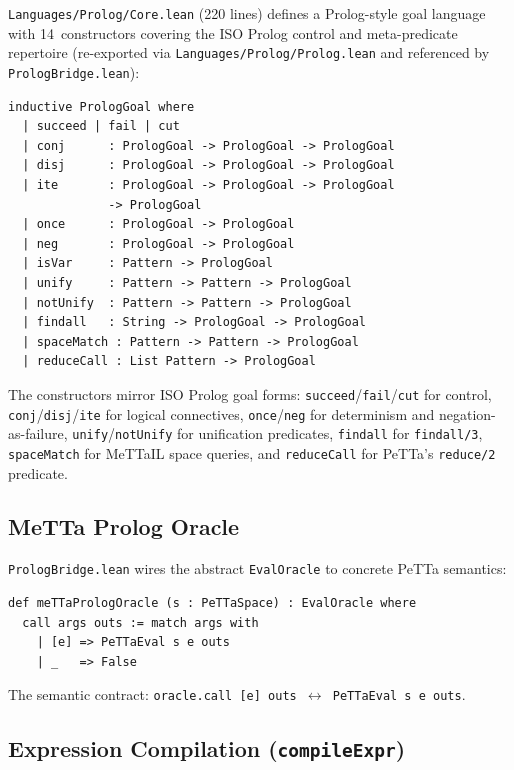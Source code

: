 \documentclass[]{article}
\newcommand{\code}[1]{\texttt{#1}}
\newcommand{\PeTTa}{\textup{PeTTa}}
\newcommand{\MeTTaIL}{\textup{MeTTaIL}}
\begin{document}
\code{Languages/Prolog/Core.lean} (220 lines) defines a Prolog-style goal language
with 14~constructors covering the ISO Prolog control and meta-predicate
repertoire (re-exported via \code{Languages/Prolog/Prolog.lean} and referenced by
\code{PrologBridge.lean}):

\begin{lstlisting}[language=lean]
inductive PrologGoal where
  | succeed | fail | cut
  | conj      : PrologGoal -> PrologGoal -> PrologGoal
  | disj      : PrologGoal -> PrologGoal -> PrologGoal
  | ite       : PrologGoal -> PrologGoal -> PrologGoal
              -> PrologGoal
  | once      : PrologGoal -> PrologGoal
  | neg       : PrologGoal -> PrologGoal
  | isVar     : Pattern -> PrologGoal
  | unify     : Pattern -> Pattern -> PrologGoal
  | notUnify  : Pattern -> Pattern -> PrologGoal
  | findall   : String -> PrologGoal -> PrologGoal
  | spaceMatch : Pattern -> Pattern -> PrologGoal
  | reduceCall : List Pattern -> PrologGoal
\end{lstlisting}

\noindent
The constructors mirror ISO Prolog goal forms:
\code{succeed}/\code{fail}/\code{cut} for control,
\code{conj}/\code{disj}/\code{ite} for logical connectives,
\code{once}/\code{neg} for determinism and negation-as-failure,
\code{unify}/\code{notUnify} for unification predicates,
\code{findall} for \code{findall/3},
\code{spaceMatch} for \MeTTaIL{} space queries, and
\code{reduceCall} for \PeTTa{}'s \code{reduce/2} predicate.

\subsection{MeTTa Prolog Oracle}

\code{PrologBridge.lean} wires the abstract \code{EvalOracle} to
concrete \PeTTa{} semantics:

\begin{lstlisting}[language=lean]
def meTTaPrologOracle (s : PeTTaSpace) : EvalOracle where
  call args outs := match args with
    | [e] => PeTTaEval s e outs
    | _   => False
\end{lstlisting}

The semantic contract: \code{oracle.call [e] outs $\leftrightarrow$
PeTTaEval s e outs}.

\subsection{Expression Compilation (\code{compileExpr})}
\end{document}
